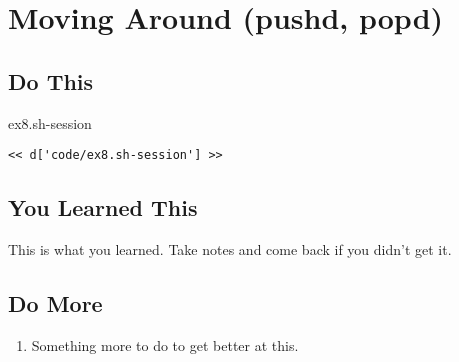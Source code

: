\chapter{Moving Around (pushd, popd)}

\section{Do This}

\begin{code}{ex8.sh-session}
\begin{Verbatim}
<< d['code/ex8.sh-session'] >>
\end{Verbatim}
\end{code}


\section{You Learned This}

This is what you learned.  Take notes and come back if you didn't get it.

\section{Do More}

\begin{enumerate}
\item Something more to do to get better at this.
\end{enumerate}


